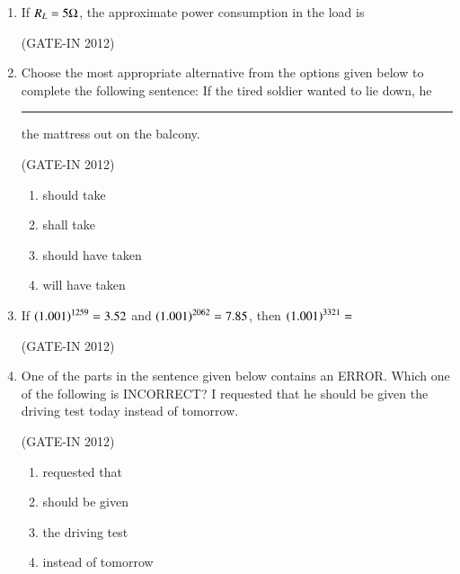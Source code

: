 \documentclass[journal,12pt,onecolumn]{IEEEtran}
\theoremstyle{remark}
\begin{document}
\begin{enumerate}
\item If $R_L = 5 \ohm$, the approximate power consumption in the load is

\hfill{(GATE-IN 2012)}
\begin{enumerate}
\end{enumerate}

\item Choose the most appropriate alternative from the options given below to complete the following sentence:
If the tired soldier wanted to lie down, he \rule{2cm}{0.4pt} the mattress out on the balcony.

\hfill{(GATE-IN 2012)}
\begin{enumerate}
    \item should take
    \item shall take
    \item should have taken
    \item will have taken
\end{enumerate}

\item If $\left(1.001\right)^{1259} = 3.52$ and $\left(1.001\right)^{2062} = 7.85$, then $\left(1.001\right)^{3321} =$

\hfill{(GATE-IN 2012)}
\begin{enumerate}
\end{enumerate}

\item One of the parts  in the sentence given below contains an ERROR. Which one of the following is INCORRECT?
I requested that he should be given the driving test today instead of tomorrow.

\hfill{(GATE-IN 2012)}
\begin{enumerate}
    \item requested that
    \item should be given
    \item the driving test
    \item instead of tomorrow
\end{enumerate}


\end{enumerate}
\end{document}
